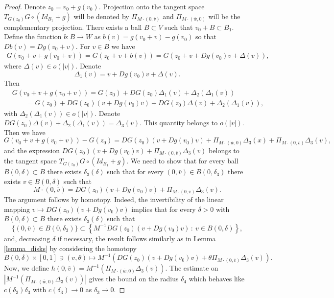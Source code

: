 \documentclass[11pt, leqno]{amsart}
\theoremstyle{definition}
\begin{document}
	 	\begin{proof}
	 		Denote $z_0=v_0+g(v_0)$. Projection onto the tangent space $T_{G(z_0)}G\circ (Id_{B_1}+g)$ will be denoted by $\Pi_{M\cdot (0,\overline{v})}$ and $\Pi_{M\cdot (\overline{w},0)}$ will be the complementary projection. There exists a ball $B\subset V$ such that $v_0 + B \subset B_1$. Define the function $b:B\to W$ as $b(v)=g(v_0+v)-g(v_0)$ so that $Db(v) = Dg(v_0+v)$. For $v\in B$ we have
	 		\begin{align*}
	 			G(v_0+v+g(v_0+v)) = G(z_0+v+b(v)) = G\left(z_0+v+Dg(v_0)v+\Delta(v)\right),
	 		\end{align*}
	 		where $\Delta(v) \in o(|v|)$. Denote
	 		$$
	 		\Delta_1 (v) = v+Dg(v_0)v+\Delta(v).
	 		$$
	 		 Then
	 		\begin{align*}
	 			&  G(v_0+v+g(v_0+v)) = G(z_0)+DG(z_0)\Delta_1(v) + \Delta_2(\Delta_1(v))\\
	 			& \qquad  = G(z_0)+DG(z_0)\left(v+Dg(v_0)v\right)+DG(z_0)\Delta(v) + \Delta_2(\Delta_1(v)),
	 		\end{align*}
	 		with $\Delta_2(\Delta_1(v))\in o(|v|)$.
	 		Denote $DG(z_0)\Delta(v) + \Delta_2(\Delta_1(v)) = \Delta_3(v)$. This quantity belongs to $o(|v|)$. Then we have
	 		$$
	 		G(v_0+v+g(v_0+v)) - G(z_0) =DG(z_0)\left(v+Dg(v_0)v\right)+\Pi_{M\cdot (\overline{w},0)}\Delta_3(x) + \Pi_{M\cdot (0,\overline{v})}\Delta_3(v),
	 		$$
	 		and the expression $DG(z_0)\left(v+Dg(v_0)v\right)+\Pi_{M\cdot (0,\overline{v})}\Delta_3(v)$ belongs to the tangent space $T_{G(z_0)}G\circ (Id_{B_1}+g)$. We need to show that for every ball $B(0,\delta)\subset B$
	 		there exists $\delta_3(\delta)$ such that for every $(0,\overline{v})\in B(0,\delta_3)$ there exists $v\in B(0,\delta)$ such that
	 		$$
	 		M\cdot (0,\overline{v}) = DG(z_0)\left(v+Dg(v_0)v\right)+\Pi_{M\cdot (0,\overline{v})}\Delta_3(v).
	 		$$
	 		The argument follows by homotopy. Indeed, the invertibility of the linear mapping $v\mapsto DG(z_0)(v+Dg(v_0)v)$ implies that  for every $\delta>0$ with $B(0,\delta)\subset B$ there exists ${\delta_3}(\delta)$ such that
	 		$$
	 		\{ (0,\overline{v}) \in B(0,\delta_3)  \} \subset \left\{ M^{-1} DG(z_0)\left(v+Dg(v_0)v\right)\, : \ v\in B(0, \delta)\right\},
	 		$$
	 		and, decreasing $\delta$ if necessary, the result follows similarly as in Lemma \ref{lemma_disks} by considering the homotopy
	 		$$
	 		B(0,\delta)\times [0,1]\ni (v,\theta) \mapsto M^{-1}\left(DG(z_0)\left(v+Dg(v_0)v\right)+\theta \Pi_{M\cdot (0,\overline{v})}\Delta_3(v)\right).
	 		$$ Now, we define $h(0,\overline{v}) = M^{-1}(\Pi_{M\cdot (\overline{w},0)}\Delta_3(v))$. The estimate on $|M^{-1}(\Pi_{M\cdot (\overline{w},0)}\Delta_3(v))|$ gives the bound on the radius $\delta_4$ which behaves like $c(\delta_3)\delta_3$ with $c(\delta_3)\to 0$ as $\delta_3\to 0$. 
	 		

\end{proof}
\end{document}
